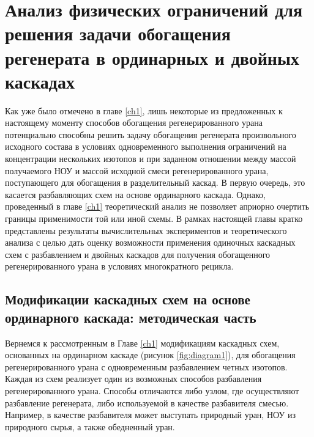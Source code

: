 \chapter{Анализ физических ограничений для решения задачи обогащения регенерата в ординарных и двойных каскадах}\label{ch:ch2}

Как уже было отмечено в главе \ref{ch1}, лишь некоторые из предложенных к настоящему моменту способов обогащения регенерированного урана потенциально способны решить задачу обогащения регенерата произвольного исходного состава в условиях одновременного выполнения ограничений на концентрации нескольких изотопов и при заданном отношении между массой получаемого НОУ и массой исходной смеси регенерированного урана, поступающего для обогащения в разделительный каскад. В первую очередь, это касается разбавляющих схем на основе ординарного каскада. 
Однако, проведенный в главе \ref{ch1} теоретический анализ не позволяет априорно очертить границы применимости той или иной схемы. В рамках настоящей главы кратко представлены результаты вычислительных экспериментов и теоретического анализа с целью дать оценку возможности применения одиночных каскадных схем с разбавлением и двойных каскадов для получения обогащенного регенерированного урана в условиях многократного рецикла. 

\section{Модификации каскадных схем на основе ординарного каскада: методическая часть}\label{ch2_stat}

Вернемся к рассмотренным в Главе \ref{ch1} модификациям каскадных схем, основанных на ординарном каскаде (рисунок \ref{fig:diagram1}), для обогащения регенерированного урана с одновременным разбавлением четных изотопов. Каждая из схем реализует один из возможных способов разбавления регенерированного урана. Способы отличаются либо узлом, где осуществляют разбавление регенерата, либо используемой в качестве разбавителя смесью. Например, в качестве разбавителя может выступать природный уран, НОУ из природного сырья, а также обедненный уран.


